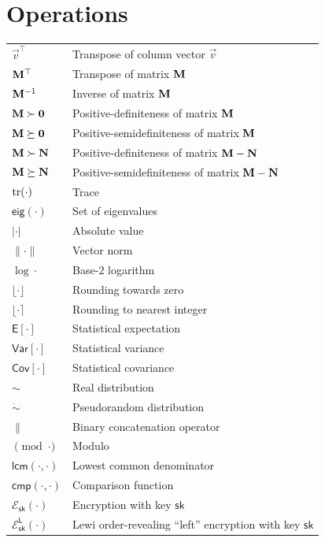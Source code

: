 \documentclass[oneside]{scrbook}
\theoremstyle{definition}
\theoremstyle{definition}
\theoremstyle{remark}
\begin{document}
\section*{Operations}
\begin{longtable}{p{}p{}}
    $\vec{v}^\top$ & Transpose of column vector $\vec{v}$\\
    ${{\mathbf{M}}}^\top$ & Transpose of matrix ${{\mathbf{M}}}$\\
    ${{\mathbf{M}}}^{-1}$ & Inverse of matrix ${{\mathbf{M}}}$\\
    ${{\mathbf{M}}}\succ{\ensuremath{{\mathbf{0}}}}$ & Positive-definiteness of matrix ${{\mathbf{M}}}$\\
    ${{\mathbf{M}}}\succeq{\ensuremath{{\mathbf{0}}}}$ & Positive-semidefiniteness of matrix ${{\mathbf{M}}}$\\
    ${{\mathbf{M}}}\succ{\ensuremath{{\mathbf{N}}}}$ & Positive-definiteness of matrix ${{\mathbf{M}}}-{{\mathbf{N}}}$\\
    ${{\mathbf{M}}}\succeq{\ensuremath{{\mathbf{N}}}}$ & Positive-semidefiniteness of matrix ${{\mathbf{M}}}-{{\mathbf{N}}}$\\
    $\operatorname{tr}(\cdot)$ & Trace\\
    $\mathsf{eig}(\cdot)$ & Set of eigenvalues\\
    $|\cdot|$ & Absolute value\\
    $\lVert\cdot\rVert$ & Vector norm\\
    $\log{\cdot}$ & Base-$2$ logarithm\\
    $\lfloor\cdot\rfloor$ & Rounding towards zero\\
    $\lfloor\cdot\rceil$ & Rounding to nearest integer\\
    $\mathsf{E}[\cdot]$ & Statistical expectation\\
    $\mathsf{Var}[\cdot]$ & Statistical variance\\
    $\mathsf{Cov}[\cdot]$ & Statistical covariance\\
    $\sim$ & Real distribution\\
    $\dot{\sim}$ & Pseudorandom distribution\\
    $\|$ & Binary concatenation operator\\
    $\pmod{\cdot}$ & Modulo\\
    $\mathsf{lcm}(\cdot,\cdot)$ & Lowest common denominator\\
    $\mathsf{cmp}(\cdot,\cdot)$ & Comparison function\\
    $\mathcal{E}_{\mathsf{sk}}(\cdot)$ & Encryption with key $\mathsf{sk}$\\
    $\mathcal{E}^{\mathsf{L}}_{\mathsf{sk}}(\cdot)$ & Lewi order-revealing ``left'' encryption with key $\mathsf{sk}$\\

\end{longtable}
\end{document}
